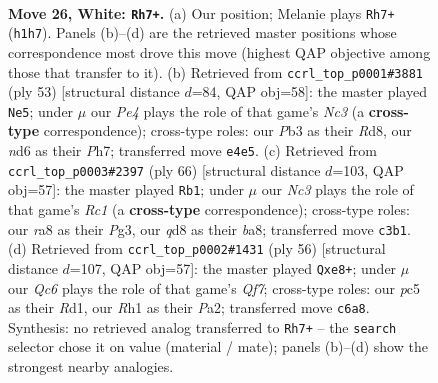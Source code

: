 \documentclass[11pt]{article}
\begin{document}
\clearpage

\begin{figure}[p]\centering
\begin{subfigure}{0.46\textwidth}\centering
\resizebox{\linewidth}{!}{%
\newchessgame
\chessboard[
  setfen={r2q1b2/3n1k2/2Qn2p1/2pP4/4P3/1PN5/P2K4/7R w - - 0 26},
  showmover=false,
  pgfstyle=straightmove, color=movearrow, markmove={h1-h7}
]}
\caption{}
\end{subfigure}\hfill
\begin{subfigure}{0.46\textwidth}\centering
\resizebox{\linewidth}{!}{%
\newchessgame
\chessboard[
  setfen={3r2k1/1p2p2p/2n2pbQ/8/7N/q5P1/4PPB1/2R3K1 b - - 1 27},
  showmover=false,
  pgfstyle=straightmove, color=movearrow, markmove={c6-e5}
]}
\caption{}
\end{subfigure}
\\[4pt]
\begin{subfigure}{0.46\textwidth}\centering
\resizebox{\linewidth}{!}{%
\newchessgame
\chessboard[
  setfen={b3r3/5pk1/3Qnn1p/3p4/5P2/4P1P1/7P/2R3K1 w - - 3 34},
  showmover=false,
  pgfstyle=straightmove, color=movearrow, markmove={c1-b1}
]}
\caption{}
\end{subfigure}\hfill
\begin{subfigure}{0.46\textwidth}\centering
\resizebox{\linewidth}{!}{%
\newchessgame
\chessboard[
  setfen={1k2r3/1b1n1Q2/p7/3n2q1/1p6/8/PPP1N3/1K1R4 w - - 0 29},
  showmover=false,
  pgfstyle=straightmove, color=movearrow, markmove={f7-e8}
]}
\caption{}
\end{subfigure}
\caption{\textbf{Move 26, White: \texttt{Rh7+}.} (a) Our position; Melanie plays \texttt{Rh7+} (\texttt{h1h7}). Panels (b)--(d) are the retrieved master positions whose correspondence most drove this move (highest QAP objective among those that transfer to it). (b) Retrieved from \texttt{ccrl\_top\_p0001\#3881} (ply 53) [structural distance $d$=84, QAP obj=58]: the master played \texttt{Ne5}; under $\mu$ our \emph{Pe4} plays the role of that game's \emph{Nc3} (a \textbf{cross-type} correspondence); cross-type roles: our \emph{P}b3 as their \emph{R}d8, our \emph{n}d6 as their \emph{P}h7; transferred move \texttt{e4e5}. (c) Retrieved from \texttt{ccrl\_top\_p0003\#2397} (ply 66) [structural distance $d$=103, QAP obj=57]: the master played \texttt{Rb1}; under $\mu$ our \emph{Nc3} plays the role of that game's \emph{Rc1} (a \textbf{cross-type} correspondence); cross-type roles: our \emph{r}a8 as their \emph{P}g3, our \emph{q}d8 as their \emph{b}a8; transferred move \texttt{c3b1}. (d) Retrieved from \texttt{ccrl\_top\_p0002\#1431} (ply 56) [structural distance $d$=107, QAP obj=57]: the master played \texttt{Qxe8+}; under $\mu$ our \emph{Qc6} plays the role of that game's \emph{Qf7}; cross-type roles: our \emph{p}c5 as their \emph{R}d1, our \emph{R}h1 as their \emph{P}a2; transferred move \texttt{c6a8}. Synthesis: no retrieved analog transferred to \texttt{Rh7+} -- the \texttt{search} selector chose it on value (material / mate); panels (b)--(d) show the strongest nearby analogies.}
\label{fig:thought-m50}
\end{figure}
\end{document}
